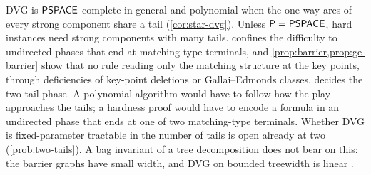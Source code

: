 \begin{remark}\label{rem:tails-complexity}
DVG is $\mathsf{PSPACE}$-complete in general \cite{LichtensteinSipser} and polynomial when the one-way arcs of every strong component share a tail (\cref{cor:star-dvg}). Unless $\mathsf{P}=\mathsf{PSPACE}$, hard instances need strong components with many tails.  confines the difficulty to undirected phases that end at matching-type terminals, and \cref{prop:barrier,prop:ge-barrier} show that no rule reading only the matching structure at the key points, through deficiencies of key-point deletions or Gallai--Edmonds classes, decides the two-tail phase. A polynomial algorithm would have to follow how the play approaches the tails; a hardness proof would have to encode a formula in an undirected phase that ends at one of two matching-type terminals. Whether DVG is fixed-parameter tractable in the number of tails is open already at two (\cref{prob:two-tails}). A bag invariant of a tree decomposition does not bear on this: the barrier graphs have small width, and DVG on bounded treewidth is linear \cite{Bodlaender}.
\end{remark}
